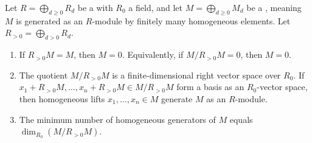 \begin{proposition}  \label{proposition:nakayamas_lemma_for_finitely_generated_graded_modules_over_a_non_negatively_graded_ring}

	Let $R = \bigoplus_{d \geq 0} R_d$ be a  with $R_0$ a field, and let $M = \bigoplus_{d \geq 0} M_d$ be a , meaning $M$ is generated as an $R$-module by finitely many homogeneous elements. Let $R_{>0} = \bigoplus_{d > 0} R_d$.

	\begin{enumerate}
	    \item If $R_{>0}M = M$, then $M = 0$. Equivalently, if $M/R_{>0}M = 0$, then $M = 0$.

	    \item The quotient $M/R_{>0}M$ is a finite-dimensional right vector space over $R_0$. If $x_1 + R_{>0}M, \ldots, x_n + R_{>0}M \in M/R_{>0}M$ form a basis as an $R_0$-vector space, then homogeneous lifts $x_1, \ldots, x_n \in M$ generate $M$ as an $R$-module.

	    \item The minimum number of homogeneous generators of $M$ equals $\dim_{R_0}(M/R_{>0}M)$.
	\end{enumerate}
\end{proposition}
